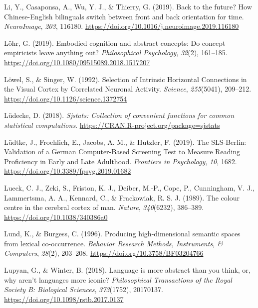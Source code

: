 \documentclass[
  a4paper,12pt,twoside,onecolumn,openright,final,oldfontcommands]{memoir}
\newlength{\cslhangindent}
\newlength{\cslentryspacingunit} %
\newenvironment{CSLReferences}[2] %
 {%
  \setlength{\parindent}{0pt}
  \ifodd #1
  \let\oldpar\par
  \def\par{\hangindent=\cslhangindent\oldpar}
  \fi
  \setlength{\parskip}{#2\cslentryspacingunit}
 }%
 {}
\begin{document}
\begin{CSLReferences}{1}{0}
\leavevmode{}%
Li, Y., Casaponsa, A., Wu, Y. J., \& Thierry, G. (2019). Back to the future? {How} {Chinese}-{English} bilinguals switch between front and back orientation for time. \emph{NeuroImage}, \emph{203}, 116180. \url{https://doi.org/10.1016/j.neuroimage.2019.116180}

\leavevmode{}%
Löhr, G. (2019). Embodied cognition and abstract concepts: {Do} concept empiricists leave anything out? \emph{Philosophical Psychology}, \emph{32}(2), 161--185. \url{https://doi.org/10.1080/09515089.2018.1517207}

\leavevmode{}%
Löwel, S., \& Singer, W. (1992). Selection of {Intrinsic} {Horizontal} {Connections} in the {Visual} {Cortex} by {Correlated} {Neuronal} {Activity}. \emph{Science}, \emph{255}(5041), 209--212. \url{https://doi.org/10.1126/science.1372754}

\leavevmode{}%
Lüdecke, D. (2018). \emph{Sjstats: Collection of convenient functions for common statistical computations}. \url{https://CRAN.R-project.org/package=sjstats}

\leavevmode{}%
Lüdtke, J., Froehlich, E., Jacobs, A. M., \& Hutzler, F. (2019). The {SLS}-{Berlin}: {Validation} of a {German} {Computer}-{Based} {Screening} {Test} to {Measure} {Reading} {Proficiency} in {Early} and {Late} {Adulthood}. \emph{Frontiers in Psychology}, \emph{10}, 1682. \url{https://doi.org/10.3389/fpsyg.2019.01682}

\leavevmode{}%
Lueck, C. J., Zeki, S., Friston, K. J., Deiber, M.-P., Cope, P., Cunningham, V. J., Lammertsma, A. A., Kennard, C., \& Frackowiak, R. S. J. (1989). The colour centre in the cerebral cortex of man. \emph{Nature}, \emph{340}(6232), 386--389. \url{https://doi.org/10.1038/340386a0}

\leavevmode{}%
Lund, K., \& Burgess, C. (1996). Producing high-dimensional semantic spaces from lexical co-occurrence. \emph{Behavior Research Methods, Instruments, \& Computers}, \emph{28}(2), 203--208. \url{https://doi.org/10.3758/BF03204766}

\leavevmode{}%
Lupyan, G., \& Winter, B. (2018). Language is more abstract than you think, or, why aren't languages more iconic? \emph{Philosophical Transactions of the Royal Society B: Biological Sciences}, \emph{373}(1752), 20170137. \url{https://doi.org/10.1098/rstb.2017.0137}


\end{CSLReferences}
\end{document}
